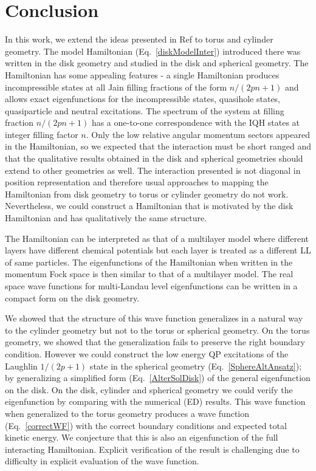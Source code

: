 \documentclass[prb,aps,epsfig,longbibliography,twocolumn]{revtex4-1}
\begin{document}
\section{Conclusion} \label{conclusion}

In this work, we extend the ideas presented in Ref  to torus and cylinder geometry. The model Hamiltonian (Eq.~\eqref{diskModelInter}) introduced there was written in the disk geometry and studied in the disk and spherical geometry. 
%
The Hamiltonian has some appealing features - a single Hamiltonian produces incompressible states at all Jain filling fractions of the form $n/(2pn+1)$ and allows exact eigenfunctions for the incompressible states, quasihole states, quasiparticle and neutral excitations. The spectrum of the system at filling fraction $n/(2pn+1)$ has a one-to-one correspondence with the IQH states at integer filling factor $n$. 
%
Only the low relative angular momentum sectors appeared in the Hamiltonian, so we expected that the interaction must be short ranged and that the qualitative results obtained in the disk and spherical geometries should extend to other geometries as well. The interaction presented is not diagonal in position representation and therefore usual approaches to mapping the Hamiltonian from disk geometry to torus or cylinder geometry do not work. Nevertheless, we could construct a Hamiltonian that is motivated by the disk Hamiltonian and has qualitatively the same structure.

The Hamiltonian can be interpreted as that of a multilayer model where different layers have different chemical potentials but each layer is treated as a different LL of same particles. The eigenfunctions of the Hamiltonian when written in the momentum Fock space is then similar to that of a multilayer model. The real space wave functions for multi-Landau level eigenfunctions can be written in a compact form on the disk geometry. 

We showed that the structure of this wave function generalizes in a natural way to the cylinder geometry but not to the torus or spherical geometry. On the torus geometry, we showed that the generalization fails to preserve the right boundary condition. However we could construct the low energy QP excitations of the Laughlin $1/(2p+1)$ state in the spherical geometry (Eq.~\eqref{SphereAltAnsatz}); by generalizing a simplified form (Eq.~\eqref{AlterSolDisk})  of the general eigenfunction on the disk. On the disk, cylinder and spherical geometry we could verify the eigenfunction by comparing with the numerical (ED) results. This wave function when generalized to the torus geometry produces a wave function (Eq.~\eqref{correctWF}) with the correct boundary conditions and expected total kinetic energy. We conjecture that this is also an eigenfunction of the full interacting Hamiltonian. Explicit verification of the result is challenging due to difficulty in explicit evaluation of the wave function.
\end{document}

